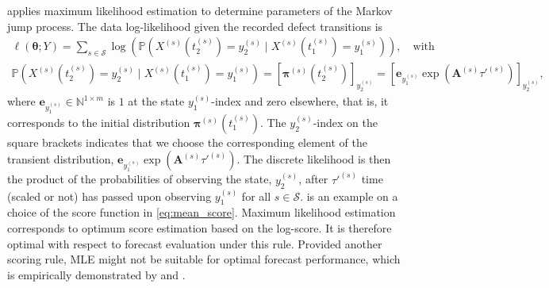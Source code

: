 \citet{bisgaard2024A} applies maximum likelihood estimation to determine parameters of the Markov jump process.
The data log-likelihood given the recorded defect transitions is 
\begin{equation}
\begin{aligned}
                  \ell\left( \bm{\theta}; Y \right) = 
                  \sum_{s \in \mathcal{S}} \log \left( \mathds{P}\left(X^{(s)}(t_2^{(s)}) = y_2^{(s)} \mid X^{(s)}(t_1^{(s)}) = y_1^{(s)} \right) \right), \quad \text{with} \\ 
                 \mathds{P}\left(X^{(s)}(t_2^{(s)}) = y_2^{(s)} \mid X^{(s)}(t_1^{(s)}) = y_1^{(s)} \right) = \left[ \bm{\pi}^{(s)}\left( t_2^{(s)} \right)  \right]_{ y_2^{(s)}} =  \left[ \bm{e}_{y_{1}^{(s)}}  \exp \left( \bm{A}^{(s)} \tau'^{(s)} \right) \right]_{ y_2^{(s)}},
                  \label{eq:likelihood_mjp}
\end{aligned}     
\end{equation}
where $\bm{e}_{y_{1}^{(s)}} \in \mathbb{N}^{1 \times m}$ is $1$ at the state $y_{1}^{(s)}$-index and zero elsewhere, that is, it corresponds to the initial distribution $\bm{\pi}^{(s)}(t_1^{(s)})$. The $y_2^{(s)}$-index on the square brackets indicates that we choose the corresponding element of the transient distribution, $\bm{e}_{y_{1}^{(s)}}  \exp \left( \bm{A}^{(s)} \tau'^{(s)} \right)$. 
The discrete likelihood is then the product of the probabilities of observing the state, $y_2^{(s)}$, after $\tau'^{(s)}$ time (scaled or not) has passed upon observing $y_1^{(s)}$ for all $s \in \mathcal{S}$.
 is an example on a choice of the score function in \cref{eq:mean_score}.
Maximum likelihood estimation corresponds to optimum score estimation based on the log-score. It is therefore optimal with respect to forecast evaluation under this rule. Provided another scoring rule, MLE might not be suitable for optimal forecast performance, which is empirically demonstrated by \citet{Gneiting2005} and \citet{gebetsberger2018a}.
